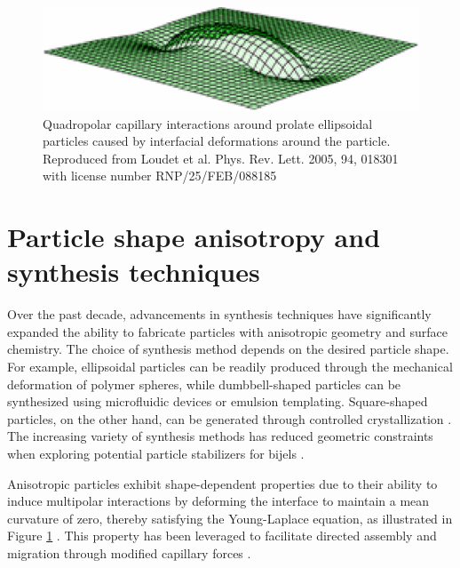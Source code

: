 \begin{figure}
    \centering
    \includegraphics[scale = 0.5]{figures/literature_review/interfacial_curvature.png}
    \caption{Quadropolar capillary interactions around prolate ellipsoidal particles caused by interfacial deformations 
             around the particle. \cite{loudet_capillary_2005} Reproduced from Loudet et al. Phys. Rev. Lett. 2005, 94, 018301
             with license number RNP/25/FEB/088185}
    \label{fig:anisotropic_particle_interface}
\end{figure}

\section{Particle shape anisotropy and synthesis techniques}

Over the past decade, advancements in synthesis techniques have significantly expanded the ability to fabricate particles with anisotropic geometry and surface chemistry. 
The choice of synthesis method depends on the desired particle shape. For example, ellipsoidal particles can be readily produced through the mechanical deformation of 
polymer spheres, while dumbbell-shaped particles can be synthesized using microfluidic devices or emulsion templating. Square-shaped particles, on the other hand, can be 
generated through controlled crystallization \cite{morgan_understanding_2013}. The increasing variety of synthesis methods has reduced geometric constraints when exploring 
potential particle stabilizers for bijels \cite{wu_recent_2016}.

Anisotropic particles exhibit shape-dependent properties due to their ability to induce multipolar interactions by deforming the interface to maintain a mean curvature of 
zero, thereby satisfying the Young-Laplace equation, as illustrated in Figure \ref{fig:anisotropic_particle_interface} \cite{loudet_capillary_2005, cheng_shape-anisotropic_2013}.
This property has been leveraged to facilitate directed assembly and migration through modified capillary forces 
\cite{cavallaro_curvature-driven_2011, read_dimerization_2020, sharifi-mood_curvature_2015}.  

